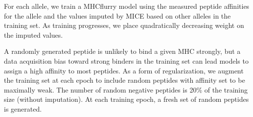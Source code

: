 For each allele, we train a MHCflurry model using the measured peptide affinities for the allele and the values imputed by MICE based on other alleles in the training set. As training progresses, we place quadratically decreasing weight on the imputed values.

A randomly generated peptide is unlikely to bind a given MHC strongly, but a data acquisition bias toward strong binders in the training set can lead models to assign a high affinity to most peptides. As a form of regularization, we augment the training set at each epoch to include random peptides with affinity set to be maximally weak. The number of random negative peptides is 20\% of the training size (without imputation). At each training epoch, a fresh set of random peptides is generated.

